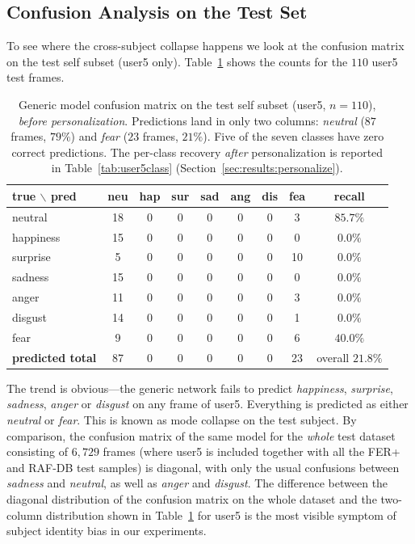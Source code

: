 \documentclass[12pt,a4paper]{article}
\begin{document}
\subsection{Confusion Analysis on the Test Set}
\label{sec:results:confusion}

To see where the cross-subject collapse happens we look at the
confusion matrix on the test self subset (user5 only).
Table~\ref{tab:selfconf} shows the counts for the $110$ user5
test frames.

\begin{table}[H]
  \centering
  \footnotesize
  \begin{tabular}{l|ccccccc|c}
    \toprule
    true $\backslash$ pred & neu & hap & sur & sad & ang & dis & fea & recall \\
    \midrule
    neutral   & 18 & 0 & 0 & 0 & 0 & 0 & 3  & $85.7\%$ \\
    happiness & 15 & 0 & 0 & 0 & 0 & 0 & 0  & $0.0\%$ \\
    surprise  & 5  & 0 & 0 & 0 & 0 & 0 & 10 & $0.0\%$ \\
    sadness   & 15 & 0 & 0 & 0 & 0 & 0 & 0  & $0.0\%$ \\
    anger     & 11 & 0 & 0 & 0 & 0 & 0 & 3  & $0.0\%$ \\
    disgust   & 14 & 0 & 0 & 0 & 0 & 0 & 1  & $0.0\%$ \\
    fear      & 9  & 0 & 0 & 0 & 0 & 0 & 6  & $40.0\%$ \\
    \midrule
    \textbf{predicted total} & 87 & 0 & 0 & 0 & 0 & 0 & 23 & overall $21.8\%$ \\
    \bottomrule
  \end{tabular}
  \caption{\footnotesize Generic model confusion matrix on the test self
  subset (user5, $n=110$), \emph{before personalization}.
  Predictions land in only two columns: \emph{neutral}
  ($87$ frames, $79\%$) and \emph{fear} ($23$ frames, $21\%$).
  Five of the seven classes have zero correct predictions.
  The per-class recovery \emph{after} personalization is
  reported in Table~\ref{tab:user5class}
  (Section~\ref{sec:results:personalize}).}
  \label{tab:selfconf}
\end{table}

The trend is obvious—the generic network fails to predict
\emph{happiness}, \emph{surprise}, \emph{sadness},
\emph{anger} or \emph{disgust} on any frame of user5.
Everything is predicted as either \emph{neutral} or
\emph{fear}. This is known as mode collapse on the test
subject. By comparison, the confusion matrix of the same
model for the \emph{whole} test dataset consisting of
$6{,}729$ frames (where user5 is included together with
all the FER+ and RAF-DB test samples) is diagonal, with
only the usual confusions between \emph{sadness} and
\emph{neutral}, as well as \emph{anger} and \emph{disgust}.
The difference between the diagonal distribution of the
confusion matrix on the whole dataset and the two-column
distribution shown in Table~\ref{tab:selfconf} for user5
is the most visible symptom of
subject identity bias in our experiments.
\end{document}
